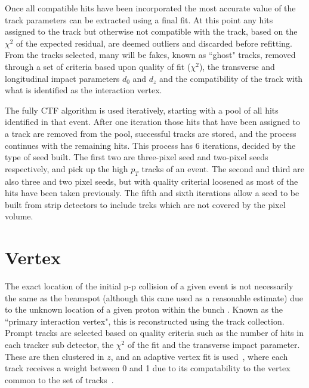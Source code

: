 Once all compatible hits have been incorporated the most accurate value of the track parameters can be extracted using a final fit. At this point any hits assigned to the track but otherwise not compatible with the track, based on the $\chi^{2}$ of the expected residual, are deemed outliers and discarded before refitting. From the tracks selected, many will be fakes, known as ``ghost" tracks, removed through a set of criteria based upon quality of fit ($\chi^{2}$), the transverse and longitudinal impact parameters $d_{0}$ and $d_{z}$ and the compatibility of the track with what is identified as the interaction vertex. 

The fully CTF algorithm is used iteratively, starting with a pool of all hits identified in that event. After one iteration those hits that have been assigned to a track are removed from the pool, successful tracks are stored, and the process continues with the remaining hits. This process has 6 iterations, decided by the type of seed built. The first two are three-pixel seed and two-pixel seeds respectively, and pick up the high $p_{T}$ tracks of an event. The second and third are also three and two pixel seeds, but with quality criterial loosened as most of the hits have been taken previously. The fifth and sixth iterations allow a seed to be built from strip detectors to include treks which are not covered by the pixel volume.

\section{Vertex}

The exact location of the initial p-p collision of a given event is not necessarily the same as the beamspot (although this cane used as a reasonable estimate) due to the unknown location of a given proton within the bunch . Known as the ``primary interaction vertex", this is reconstructed using the track collection. Prompt tracks are selected based on quality criteria such as the number of hits in each tracker sub detector, the $\chi^{2}$ of the fit and the transverse impact parameter. These are then clustered in $z$, and an adaptive vertex fit is used~\cite{AVF}, where each track receives a weight between 0 and 1 due to its compatability to the vertex common to the set of tracks~\cite{TRK-10-005}. 


